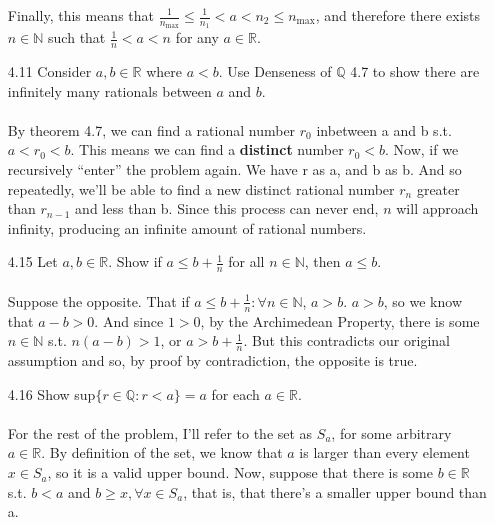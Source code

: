 \begin{itemize}
    Finally, this means that $\frac{1}{n_{\text{max}}} \leq \frac{1}{n_1} < a < n_2 \leq n_{\text{max}}$, and therefore there exists $n \in \mathds{N}$ such that $\frac{1}{n} < a < n$ for any $a \in \mathds{R}$.
  \item [4.11]
    Consider $a,b \in \mathds{R}$ where $a < b$. Use Denseness of $\mathds{Q}$ 4.7 to show there are infinitely many rationals between $a$ and $b$.\\\\

    By theorem 4.7, we can find a rational number $r_0$ inbetween a and b s.t. $a < r_0 < b$. This means we can find a \textbf{distinct} number $r_0 < b$. Now, if we recursively ``enter'' the problem again. We have r as a, and b as b. And so repeatedly, we'll be able to find a new distinct rational number $r_n$ greater than $r_{n-1}$ and less than b. Since this process can never end, $n$ will approach infinity, producing an infinite amount of rational numbers.
  \item [4.15]
    Let $a,b \in \mathds{R}$. Show if $a \leq b + \frac{1}{n}$ for all $n \in \mathds{N}$, then $a \leq b$.\\\\

    Suppose the opposite. That if $a \leq b + \frac{1}{n} : \forall n \in \mathds{N}$, $a > b$. $a > b$, so we know that $a-b > 0$. And since $1 > 0$, by the Archimedean Property, there is some $n \in \mathds{N}$ s.t. $n(a-b) > 1$, or $a > b + \frac{1}{n}$. But this contradicts our original assumption and so, by proof by contradiction, the opposite is true.
  \item [4.16]
    Show sup$\{r \in \mathds{Q} : r < a\} = a$ for each $a \in \mathds{R}$.\\\\

    For the rest of the problem, I'll refer to the set as $S_a$, for some arbitrary $a \in \mathds{R}$. By definition of the set, we know that $a$ is larger than every element $x \in S_a$, so it is a valid upper bound. Now, suppose that there is some $b \in \mathds{R}$ s.t. $b < a$ and $b \geq x, \forall x \in S_a$, that is, that there's a smaller upper bound than a.\\


\end{itemize}
